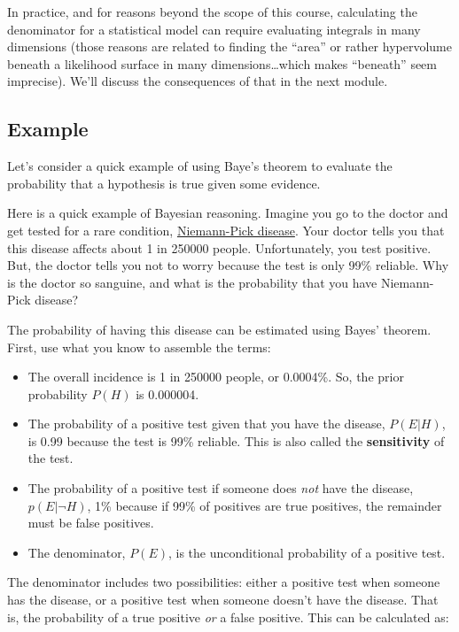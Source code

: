 \documentclass[
  13,
  letterpaper,
]{report}
\providecommand{\tightlist}{%
  \setlength{\itemsep}{0pt}\setlength{\parskip}{0pt}}
\begin{document}
In practice, and for reasons beyond the scope of this course,
calculating the denominator for a statistical model can require
evaluating integrals in many dimensions (those reasons are related to
finding the ``area'' or rather hypervolume beneath a likelihood surface
in many dimensions\ldots which makes ``beneath'' seem imprecise). We'll
discuss the consequences of that in the next module.

\subsection{Example}\label{sec-intro-bayes-example}

Let's consider a quick example of using Baye's theorem to evaluate the
probability that a hypothesis is true given some evidence.

Here is a quick example of Bayesian reasoning. Imagine you go to the
doctor and get tested for a rare condition,
\href{https://medlineplus.gov/genetics/condition/niemann-pick-disease/}{Niemann-Pick
disease}. Your doctor tells you that this disease affects about 1 in
250000 people. Unfortunately, you test positive. But, the doctor tells
you not to worry because the test is only 99\% reliable. Why is the
doctor so sanguine, and what is the probability that you have
Niemann-Pick disease?

The probability of having this disease can be estimated using Bayes'
theorem. First, use what you know to assemble the terms:

\begin{itemize}
\tightlist
\item
  The overall incidence is 1 in 250000 people, or 0.0004\%. So, the
  prior probability \(P\left(H\right)\) is 0.000004.
\item
  The probability of a positive test given that you have the disease,
  \(P\left(E|H\right)\), is 0.99 because the test is 99\% reliable. This
  is also called the \textbf{sensitivity} of the test.
\item
  The probability of a positive test if someone does \emph{not} have the
  disease, \(p\left(E|\neg H\right)\), 1\% because if 99\% of positives
  are true positives, the remainder must be false positives.
\item
  The denominator, \(P\left(E\right)\), is the unconditional probability
  of a positive test.
\end{itemize}

The denominator includes two possibilities: either a positive test when
someone has the disease, or a positive test when someone doesn't have
the disease. That is, the probability of a true positive \emph{or} a
false positive. This can be calculated as:
\end{document}
